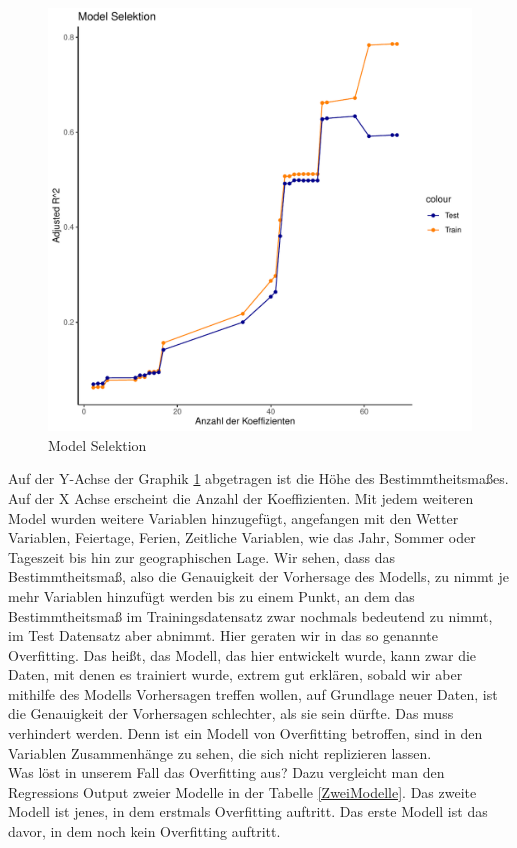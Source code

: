 \documentclass[a4paper,12pt]{thesis}
\begin{document}
\begin{figure}[]
	\centering
	\includegraphics[width=\textwidth]{Plots/ModelSelektion1.pdf}
	\caption{Model Selektion}
	\label{ModelSelektion}
\end{figure}

Auf der Y-Achse der Graphik \ref{ModelSelektion} abgetragen ist die Höhe des Bestimmtheitsmaßes. Auf der X Achse erscheint die Anzahl der Koeffizienten. Mit jedem weiteren Model wurden weitere Variablen hinzugefügt, angefangen mit den Wetter Variablen, Feiertage, Ferien, Zeitliche Variablen, wie das Jahr, Sommer oder Tageszeit bis hin zur geographischen Lage. Wir sehen, dass das Bestimmtheitsmaß, also die Genauigkeit der Vorhersage des Modells, zu nimmt je mehr Variablen hinzufügt werden bis zu einem Punkt, an dem das Bestimmtheitsmaß im Trainingsdatensatz zwar nochmals bedeutend zu nimmt, im Test Datensatz aber abnimmt. Hier geraten wir in das so genannte Overfitting. Das heißt, das Modell, das hier entwickelt wurde, kann zwar die Daten, mit denen es trainiert wurde, extrem gut erklären, sobald wir aber mithilfe des Modells Vorhersagen treffen wollen, auf Grundlage neuer Daten, ist die Genauigkeit der Vorhersagen schlechter, als sie sein dürfte. Das muss verhindert werden. Denn ist ein Modell von Overfitting betroffen, sind in den Variablen Zusammenhänge zu sehen, die sich nicht replizieren lassen.\\
Was löst in unserem Fall das Overfitting aus? Dazu vergleicht man den Regressions Output zweier Modelle in der Tabelle \ref{ZweiModelle}. Das zweite Modell ist jenes, in dem erstmals Overfitting auftritt. Das erste Modell ist das davor, in dem noch kein Overfitting auftritt.
\end{document}

